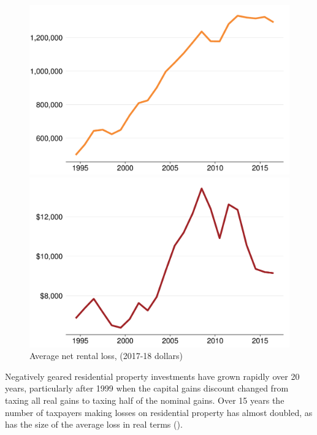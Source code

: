 \documentclass{grattan}\usepackage[]{graphicx}\usepackage[]{color}
\begin{document}
\begin{figure}
\includegraphics[width=\columnwidth]{CGT-NG-atlas//number-NG-time-series-1}
\vspace*{4pt}
\caption*{Average net rental loss, (2017-18 dollars)}\label{fig:number-NG-and-net-losses-time-series}
\includegraphics[width=\columnwidth]{CGT-NG-atlas//avg-net-losses-time-series-1}
\end{figure}

Negatively geared residential property investments have grown rapidly over 20 years, particularly after 1999 when the capital gains discount changed from taxing all real gains to taxing half of the nominal gains. Over 15 years the number of taxpayers making losses on residential property has almost doubled, as has the size of the average loss in real terms ().
\end{document}
